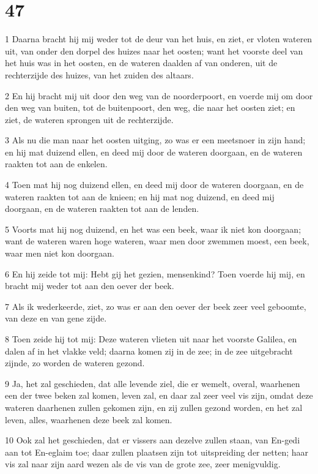 \chapter{47}

\par 1 Daarna bracht hij mij weder tot de deur van het huis, en ziet, er vloten wateren uit, van onder den dorpel des huizes naar het oosten; want het voorste deel van het huis was in het oosten, en de wateren daalden af van onderen, uit de rechterzijde des huizes, van het zuiden des altaars.
\par 2 En hij bracht mij uit door den weg van de noorderpoort, en voerde mij om door den weg van buiten, tot de buitenpoort, den weg, die naar het oosten ziet; en ziet, de wateren sprongen uit de rechterzijde.
\par 3 Als nu die man naar het oosten uitging, zo was er een meetsnoer in zijn hand; en hij mat duizend ellen, en deed mij door de wateren doorgaan, en de wateren raakten tot aan de enkelen.
\par 4 Toen mat hij nog duizend ellen, en deed mij door de wateren doorgaan, en de wateren raakten tot aan de knieen; en hij mat nog duizend, en deed mij doorgaan, en de wateren raakten tot aan de lenden.
\par 5 Voorts mat hij nog duizend, en het was een beek, waar ik niet kon doorgaan; want de wateren waren hoge wateren, waar men door zwemmen moest, een beek, waar men niet kon doorgaan.
\par 6 En hij zeide tot mij: Hebt gij het gezien, mensenkind? Toen voerde hij mij, en bracht mij weder tot aan den oever der beek.
\par 7 Als ik wederkeerde, ziet, zo was er aan den oever der beek zeer veel geboomte, van deze en van gene zijde.
\par 8 Toen zeide hij tot mij: Deze wateren vlieten uit naar het voorste Galilea, en dalen af in het vlakke veld; daarna komen zij in de zee; in de zee uitgebracht zijnde, zo worden de wateren gezond.
\par 9 Ja, het zal geschieden, dat alle levende ziel, die er wemelt, overal, waarhenen een der twee beken zal komen, leven zal, en daar zal zeer veel vis zijn, omdat deze wateren daarhenen zullen gekomen zijn, en zij zullen gezond worden, en het zal leven, alles, waarhenen deze beek zal komen.
\par 10 Ook zal het geschieden, dat er vissers aan dezelve zullen staan, van En-gedi aan tot En-eglaim toe; daar zullen plaatsen zijn tot uitspreiding der netten; haar vis zal naar zijn aard wezen als de vis van de grote zee, zeer menigvuldig.
